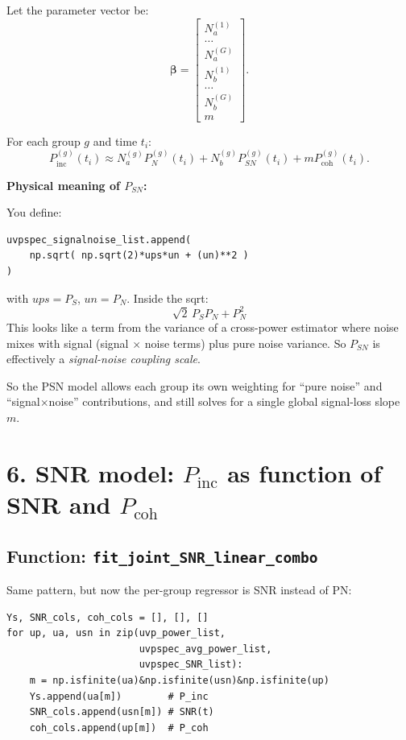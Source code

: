 \documentclass[11pt]{article}
\begin{document}
Let the parameter vector be:
\[
  \boldsymbol{\beta} =
  \begin{bmatrix}
    N_a^{(1)} \\ \dots \\ N_a^{(G)} \\
    N_b^{(1)} \\ \dots \\ N_b^{(G)} \\
    m
  \end{bmatrix}.
\]

For each group $g$ and time $t_i$:
\[
  P_{\mathrm{inc}}^{(g)}(t_i) \approx
  N_a^{(g)} P_N^{(g)}(t_i)
  + N_b^{(g)} P_{SN}^{(g)}(t_i)
  + m P_{\mathrm{coh}}^{(g)}(t_i).
\]

\textbf{Physical meaning of $P_{SN}$:}

You define:
\begin{verbatim}
uvpspec_signalnoise_list.append(
    np.sqrt( np.sqrt(2)*ups*un + (un)**2 )
)
\end{verbatim}
with $ups = P_S$, $un = P_N$. Inside the sqrt:
\[
  \sqrt{2}\, P_S P_N + P_N^2
\]
This looks like a term from the variance of a cross-power estimator where noise mixes with signal (signal $\times$ noise terms) plus pure noise variance. So $P_{SN}$ is effectively a \emph{signal-noise coupling scale}.

So the PSN model allows each group its own weighting for ``pure noise'' and ``signal$\times$noise'' contributions, and still solves for a single global signal-loss slope $m$.

\section*{6. SNR model: \texorpdfstring{$P_{\mathrm{inc}}$}{P\_inc} as function of SNR and \texorpdfstring{$P_{\mathrm{coh}}$}{P\_coh}}

\subsection*{Function: \texttt{fit\_joint\_SNR\_linear\_combo}}

Same pattern, but now the per-group regressor is SNR instead of PN:

\begin{verbatim}
Ys, SNR_cols, coh_cols = [], [], []
for up, ua, usn in zip(uvp_power_list,
                       uvpspec_avg_power_list,
                       uvpspec_SNR_list):
    m = np.isfinite(ua)&np.isfinite(usn)&np.isfinite(up)
    Ys.append(ua[m])        # P_inc
    SNR_cols.append(usn[m]) # SNR(t)
    coh_cols.append(up[m])  # P_coh
\end{verbatim}
\end{document}
